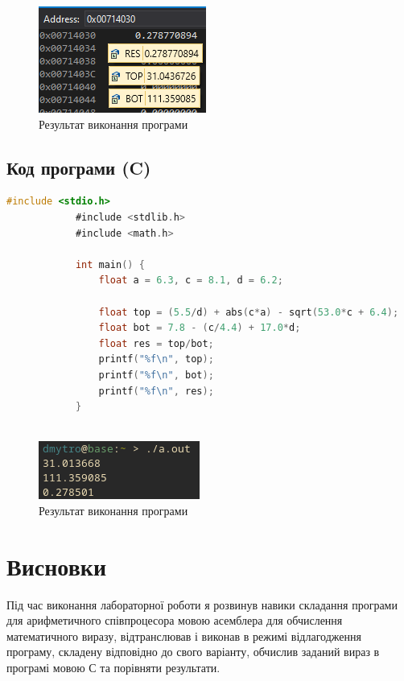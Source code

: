 \documentclass{article}
\begin{document}
\begin{normalsize}
		\begin{figure}[H]
			\centering
			\includegraphics[scale=1]{1}
			\caption{Результат виконання програми}
		\end{figure}
		
		\subsection*{Код програми (C)}
		\begin{lstlisting}[language={C}]
			#include <stdio.h>
			#include <stdlib.h>
			#include <math.h>
			
			int main() {
				float a = 6.3, c = 8.1, d = 6.2;
				
				float top = (5.5/d) + abs(c*a) - sqrt(53.0*c + 6.4);
				float bot = 7.8 - (c/4.4) + 17.0*d;
				float res = top/bot;
				printf("%f\n", top);
				printf("%f\n", bot);
				printf("%f\n", res);
			}
			
		\end{lstlisting}
		
		\begin{figure}[H]
			\centering
			\includegraphics[scale=1]{2}
			\caption{Результат виконання програми}
		\end{figure}
		
		\section*{Висновки}
		Під час виконання лабораторної роботи я розвинув навики складання програми для арифметичного співпроцесора мовою асемблера для обчислення математичного виразу, відтранслював і виконав в режимі відлагодження програму, складену відповідно до свого варіанту, обчислив заданий вираз в програмі мовою С та порівняти результати.
		
	\end{normalsize}
\end{document}
